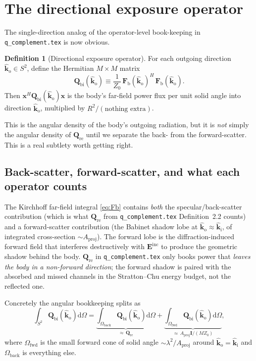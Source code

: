 \documentclass[11pt,a4paper]{article}
\theoremstyle{definition}
\newtheorem{definition}[definition]{Definition}
\newcommand{\EE}{\mathbf{E}}
\newcommand{\diff}{\mathrm{d}}
\newcommand{\Qref}{\mathbf{Q}_{\mathrm{re}}}
\newcommand{\kin}{\hat{\bm{k}}_{\mathrm{i}}}
\newcommand{\kout}{\hat{\bm{k}}_{\mathrm{o}}}
\newcommand{\Frib}{\mathbf{F}_{\mathrm{b}}}
\newcommand{\Qbist}{\mathbf{Q}_{\mathrm{bi}}}
\begin{document}
\section{The directional exposure operator}\label{sec:Qbist}

The single-direction analog of the operator-level book-keeping in
\texttt{q\_complement.tex} is now obvious.

\begin{definition}[Directional exposure operator]\label{def:Qbist}
For each outgoing direction $\kout\in S^2$, define the Hermitian
$M\!\times\!M$ matrix
\begin{equation}\label{eq:Qbist}
  \Qbist(\kout)\equiv
  \frac{1}{Z_0}\,\Frib(\kout)^H\,\Frib(\kout).
\end{equation}
Then $\mathbf{x}^H\Qbist(\kout)\mathbf{x}$ is the body's
far-field power flux per unit solid angle into direction $\kout$,
multiplied by $R^2/(\text{nothing extra})$.
\end{definition}

This is the angular density of the body's outgoing radiation, but it
is \emph{not} simply the angular density of $\Qref$ until we
separate the back- from the forward-scatter.  This is a real subtlety
worth getting right.

\subsection{Back-scatter, forward-scatter, and what each operator counts}

The Kirchhoff far-field integral \cref{eq:Fb} contains
\emph{both} the specular/back-scatter contribution (which is what
$\Qref$ from \texttt{q\_complement.tex} Definition~2.2 counts) and a
forward-scatter contribution (the Babinet shadow lobe at
$\kout\approx\kin$, of integrated cross-section
$\sim A_{\mathrm{proj}}$).  The forward lobe is the diffraction-induced
forward field that interferes destructively with $\EE^{\mathrm{inc}}$
to produce the geometric shadow behind the body.  $\Qref$ in
\texttt{q\_complement.tex} only books power that
\emph{leaves the body in a non-forward direction}; the forward
shadow is paired with the absorbed and missed channels in the
Stratton--Chu energy budget, not the reflected one.

Concretely the angular bookkeeping splits as
\begin{equation}\label{eq:split}
  \int_{S^2}\!\!\Qbist(\kout)\diff\Omega
  =\underbrace{\int_{\Omega_{\mathrm{back}}}\!\!\Qbist(\kout)\diff\Omega}_{\approx\,\Qref}
  +\underbrace{\int_{\Omega_{\mathrm{fwd}}}\!\!\Qbist(\kout)\diff\Omega}_{\approx\,A_{\mathrm{proj}}\mathbf{I}/(MZ_0)},
\end{equation}
where $\Omega_{\mathrm{fwd}}$ is the small forward cone of solid
angle $\sim\lambda^2/A_{\mathrm{proj}}$ around $\kout=\kin$ and
$\Omega_{\mathrm{back}}$ is everything else.
\end{document}
